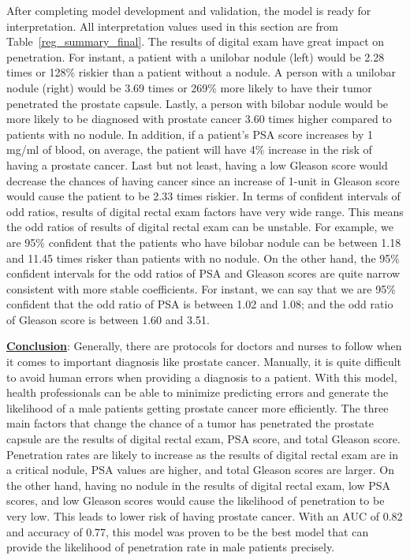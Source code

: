 \documentclass[11pt]{article}\usepackage[]{graphicx}\usepackage[]{color}
\begin{document}
\noindent After completing model development and validation, the model is ready for interpretation. All interpretation values used in this section are from Table~\ref{reg_summary_final}. The results of digital exam have great impact on penetration. For instant, a patient with a unilobar nodule (left) would be 2.28 times or 128\% riskier than a patient without a nodule. A person with a unilobar nodule (right) would be 3.69 times or 269\% more likely to have their tumor penetrated the prostate capsule. Lastly, a person with bilobar nodule would be more likely to be diagnosed with prostate cancer 3.60 times higher compared to patients with no nodule. In addition, if a patient’s PSA score increases by 1 mg/ml of blood, on average, the patient will have 4\% increase in the risk of having a prostate cancer. Last but not least, having a low Gleason score would decrease the chances of having cancer since an increase of 1-unit in Gleason score would cause the patient to be 2.33 times riskier. In terms of confident intervals of odd ratios, results of digital rectal exam factors have very wide range. This means the odd ratios of results of digital rectal exam can be unstable. For example, we are 95\% confident that the patients who have bilobar nodule can be between 1.18 and 11.45 times risker than patients with no nodule. On the other hand, the 95\% confident intervals for the odd ratios of PSA and Gleason scores are quite narrow consistent with more stable coefficients. For instant, we can say that we are 95\% confident that the odd ratio of PSA is between 1.02 and 1.08; and the odd ratio of Gleason score is between 1.60 and 3.51. 
\hfill \break


\noindent\textbf{\underline{Conclusion}}: Generally, there are protocols for doctors and nurses to follow when it comes to important diagnosis like prostate cancer. Manually, it is quite difficult to avoid human errors when providing a diagnosis to a patient. With this model, health professionals can be able to minimize predicting errors and generate the likelihood of a male patients getting prostate cancer more efficiently. The three main factors that change the chance of a tumor has penetrated the prostate capsule are the results of digital rectal exam, PSA score, and total Gleason score. Penetration rates are likely to increase as the results of digital rectal exam are in a critical nodule, PSA values are higher, and total Gleason scores are larger. On the other hand, having no nodule in the results of digital rectal exam, low PSA scores, and low Gleason scores would cause the likelihood of penetration to be very low. This leads to lower risk of having prostate cancer. With an AUC of 0.82 and accuracy of 0.77, this model was proven to be the best model that can provide the likelihood of penetration rate in male patients precisely. 
\hfill \break
\end{document}
